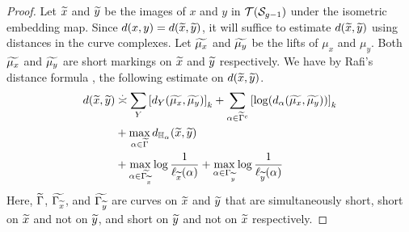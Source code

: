 \documentclass[12pt, reqno]{amsart}
\begin{document}
\begin{proof}
  Let $\widetilde{x}$ and $\widetilde{y}$ be the images of $x$ and $y$ in $\mathcal{T}(\mathcal{S}_{g-1})$ under the isometric embedding map.
  Since $d(x,y) = d(\widetilde{x}, \widetilde{y})$, it will suffice to estimate $d(\widetilde{x}, \widetilde{y})$ using distances in the curve complexes.
  Let $\widetilde{\mu_x}$ and $\widetilde{\mu_y}$ be the lifts of $\mu_x$ and $\mu_y$.
  Both $\widetilde{\mu_x}$ and $\widetilde{\mu_y}$ are short markings on $\widetilde{x}$ and $\widetilde{y}$ respectively.
  We have by Rafi's distance formula \cite[Theorem 6.1]{rafi2007combinatorial}, the following estimate on $d(\widetilde{x}, \widetilde{y})$.
  \begin{equation}
  \begin{aligned}
    d(\wt{x}, \wt{y}) &\emul \sum_{Y} \left[ d_Y(\wt{\mu_x}, \wt{\mu_y}) \right]_k + \sum_{\alpha \in \wt{\Gamma}^c} \left[ \log(d_{\alpha}(\wt{\mu_x}, \wt{\mu_y})) \right]_k \\
    &+ \max_{\alpha \in \wt{\Gamma}} d_{\mathbb{H}_{\alpha}}(\wt{x}, \wt{y})\\
    &+ \max_{\alpha \in \wt{\Gamma_{\wt{x}}}} \log \frac{1}{\ell_{\wt{x}}(\alpha)} + \max_{\alpha \in \Gamma_{\wt{y}}} \log \frac{1}{\ell_{\wt{y}}(\alpha)}
  \end{aligned}
  \label{eq:distance-formula-orient}
  \end{equation}
  Here, $\widetilde{\Gamma}$, $\widetilde{\Gamma_{\widetilde{x}}}$, and $\widetilde{\Gamma_{\widetilde{y}}}$ are curves on $\widetilde{x}$ and $\widetilde{y}$ that are simultaneously short, short on $\widetilde{x}$ and not on $\widetilde{y}$, and short on $\widetilde{y}$ and not on $\widetilde{x}$ respectively.


\end{proof}
\end{document}
